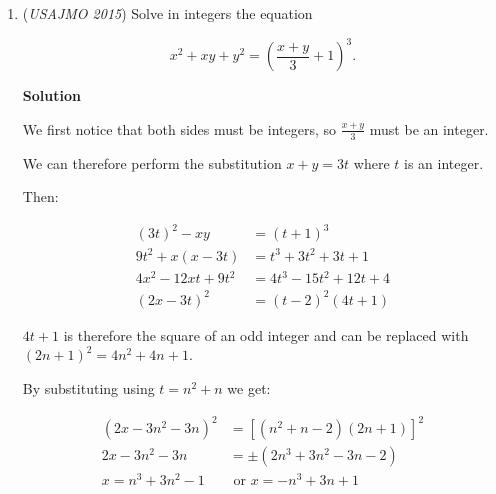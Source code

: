 \begin{enumerate}
 Obviously, there is a $-b$ in the sequence, (this will come into play later). Since $b \neq 0$ our only $0$ vanishes due to the AM, our goal is to make another $0$. Remember that for every number in the original sequence (besides $0$) there is a negative or positive value depending on the numbers sign. So even if $b$ to $-b$ or any other number in the sequence doesn't make $0$, we have another option. 

 Find any $(a, -a)$ such that $(a + -a) = 0$ (again this is guaranteed to be in the sequence). 

 Now once you have your $0$s, take the $-b$, and take the AM of that and $0$. Then there will be 2 $-b/2$s. This will make $0$s with our two numbers from $(0, b)$ since that produces 2 $b/2$s. Since those cancel and make $0$, everything else is the same positive negative condition, which finishes. ~dukcrantel

 


 


 


	\item (\textit{USAJMO 2015}) Solve in integers the equation

 \[x^2+xy+y^2 = \left(\frac{x+y}{3}+1\right)^3.\]




\textbf{Solution}

We first notice that both sides must be integers, so $\frac{x+y}{3}$ must be an integer. 

 We can therefore perform the substitution $x+y = 3t$ where $t$ is an integer. 

 Then:

 
 \begin{align*} (3t)^2 - xy &= (t+1)^3 \\ 9t^2 + x (x - 3t) &= t^3 + 3t^2 + 3t + 1 \\ 4x^2 - 12xt + 9t^2 &= 4t^3 - 15t^2 + 12t + 4 \\ (2x - 3t)^2 &= (t - 2)^2(4t + 1) \end{align*}

$4t+1$ is therefore the square of an odd integer and can be replaced with $(2n+1)^2 = 4n^2 + 4n +1$.

 By substituting using $t = n^2 + n$ we get:

 
 \begin{align*} (2x - 3n^2 - 3n)^2 &= [(n^2 + n - 2)(2n+1)]^2 \\ 2x - 3n^2 - 3n &= \pm (2n^3 + 3n^2 -3n -2) \\ x = n^3 + 3n^2 - 1 &\text{ or } x = - n^3 + 3n + 1 \end{align*}



\end{enumerate}
